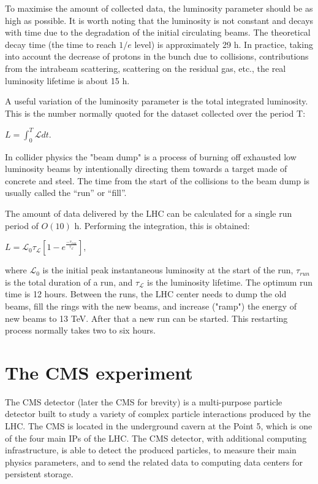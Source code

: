 \begin{normalsize}
To maximise the amount of collected data, the luminosity parameter should be as high as possible. It is worth noting that the luminosity is not constant and decays with time due to the degradation of the initial circulating beams. The theoretical decay time (the time to reach $1/e$ level) is approximately 29 h. In practice, taking into account the decrease of protons in the bunch due to collisions, contributions from the intrabeam scattering, scattering on the residual gas, etc., the real luminosity lifetime is about 15 h. 

A useful variation of the luminosity parameter is the total integrated luminosity. This is the number normally quoted for the dataset collected over the period T:

$L = \int_{0}^{T} \mathcal{L}  dt$.

In collider physics the "beam dump" is a process of burning off exhausted low luminosity beams by intentionally directing them towards a target made of concrete and steel. The time from the start of the collisions to the beam dump is usually called the ``run'' or ``fill''.

The amount of data delivered by the LHC can be calculated for a single run period of $O(10)$ h. Performing the integration, this is obtained: 

 $L = \mathcal{L}_0 \tau_\mathcal{L}  \left[  1- e^{\frac{-\tau_{run}}{\tau_\mathcal{L} }}  \right]$, 

\noindent where $\mathcal{L}_0$ is the initial peak instantaneous luminosity at the start of the run, $\tau_{run}$ is the total duration of a run, and $\tau_\mathcal{L}$ is the luminosity lifetime. The optimum run time is 12 hours. Between the runs, the LHC center needs to dump the old beams, fill the rings with the new beams, and increase ("ramp") the energy of new beams to 13 TeV. After that a new run can be started. This restarting process normally takes two to six hours.





\section{The CMS experiment}

The CMS detector (later the CMS for brevity) is a multi-purpose particle detector built to study a variety of complex particle interactions produced by the LHC. The CMS is located in the underground cavern at the Point 5, which is one of the four main IPs of the LHC. The CMS detector, with additional computing infrastructure, is able to detect the produced particles, to measure their main physics parameters, and to send the related data to computing data centers for persistent storage. 



\end{normalsize}
